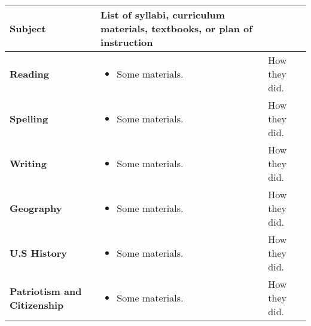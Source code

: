 \documentclass[10pt]{article}
\begin{document}
\noindent\begin{tabularx}{\textwidth}{ |p{2in}|X|X| }

\hline

{\bf Subject} & {\bf List of syllabi, curriculum materials, textbooks,
  or plan of instruction} \\

\hline

{\bf Reading} &
\begin{itemize}
\item Some materials.
\end{itemize} &

How they did. \\

\hline

{\bf Spelling} &
\begin{itemize}
\item Some materials.
\end{itemize} &

How they did. \\

\hline

{\bf Writing} &
\begin{itemize}
\item Some materials.
\end{itemize} &

How they did. \\

\hline

{\bf Geography} &
\begin{itemize}
\item Some materials.
\end{itemize} &

How they did. \\

\hline

{\bf U.S History} &
\begin{itemize}
\item Some materials.
\end{itemize} &

How they did. \\

\hline

{\bf Patriotism and Citizenship} &
\begin{itemize}
\item Some materials.
\end{itemize} &

How they did. \\


\end{tabularx}
\end{document}
